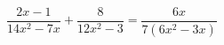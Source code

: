 \begin{ex}[type=equation]
	\begin{condition}
		$\dfrac{2x - 1}{14x^2 - 7x} + \dfrac{8}{12x^2 - 3} = \dfrac{6x}{7\left(6x^2 - 3x\right)}$
	\end{condition}
\end{ex}